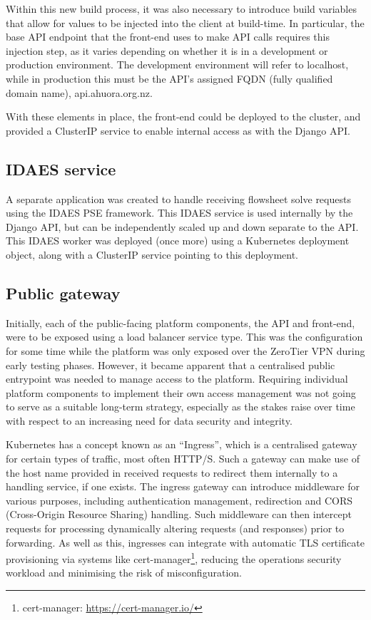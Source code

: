 Within this new build process, it was also necessary to introduce build variables that allow for values to be injected into the client at build-time. In particular, the base API endpoint that the front-end uses to make API calls requires this injection step, as it varies depending on whether it is in a development or production environment. The development environment will refer to localhost, while in production this must be the API's assigned FQDN (fully qualified domain name), api.ahuora.org.nz.

With these elements in place, the front-end could be deployed to the cluster, and provided a ClusterIP service to enable internal access as with the Django API.

\subsection{IDAES service}

A separate application was created to handle receiving flowsheet solve requests using the IDAES PSE framework. This IDAES service is used internally by the Django API, but can be independently scaled up and down separate to the API. This IDAES worker was deployed (once more) using a Kubernetes deployment object, along with a ClusterIP service pointing to this deployment.

\subsection{Public gateway}

Initially, each of the public-facing platform components, the API and front-end, were to be exposed using a load balancer service type. This was the configuration for some time while the platform was only exposed over the ZeroTier VPN during early testing phases. However, it became apparent that a centralised public entrypoint was needed to manage access to the platform. Requiring individual platform components to implement their own access management was not going to serve as a suitable long-term strategy, especially as the stakes raise over time with respect to an increasing need for data security and integrity.

Kubernetes has a concept known as an ``Ingress'', which is a centralised gateway for certain types of traffic, most often HTTP/S. Such a gateway can make use of the host name provided in received requests to redirect them internally to a handling service, if one exists. The ingress gateway can introduce middleware for various purposes, including authentication management, redirection and CORS (Cross-Origin Resource Sharing) handling. Such middleware can then intercept requests for processing dynamically altering requests (and responses) prior to forwarding. As well as this, ingresses can integrate with automatic TLS certificate provisioning via systems like cert-manager\footnote{cert-manager: \url{https://cert-manager.io/}}, reducing the operations security workload and minimising the risk of misconfiguration.

